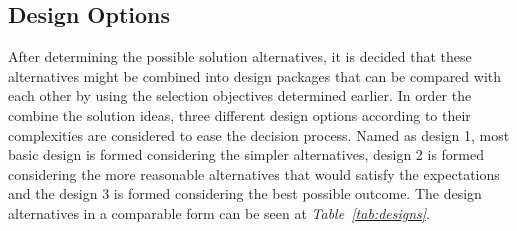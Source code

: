 \documentclass[a4paper,12pt]{article}
\begin{document}
	
	\subsection{Design Options}
	
	After determining the possible solution alternatives, it is decided that these alternatives might be combined into design packages that can be compared with each other by using the selection objectives determined earlier.  In order the combine the solution ideas, three different design options according to their complexities are considered to ease the decision process. Named as design 1, most basic design is formed considering the simpler alternatives, design 2 is formed considering the more reasonable alternatives that would satisfy the expectations and the design 3 is formed considering the best possible outcome. The design alternatives in a comparable form can be seen at \textit{Table~\ref{tab:designs}}. 
	
\end{document}
